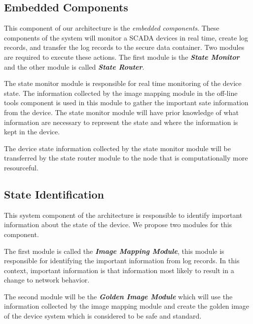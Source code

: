 \documentclass[conference]{IEEEtran}
\begin{document}
\subsection{Embedded Components}
This component of our architecture is the {\em embedded components}. These components of the system will monitor a SCADA devices in real time, create log records, and transfer the log records to the secure data container. Two modules are required to execute these actions. The first module is the \textit{\textbf{State Monitor}} and the other module is called \textit{\textbf{State Router}}.

The state monitor module is responsible for real time monitoring of the device state. The information collected by the image mapping module in the off-line tools component is used in this module to gather the important sate information from the device. The state monitor module will have prior knowledge of what information are necessary to represent the state and where the information is kept in the device. 

The device state information collected by the state monitor module will be transferred by the state router module to the node that is computationally more resourceful. 


\subsection{State Identification}
This system component of the architecture is responsible to identify important information about the state of the device.  We propose two modules for this component. \par The first module is called the \textit{\textbf{Image Mapping Module}}, this module is responsible for identifying the important information from log records.  In this context, important information is that information most likely to result in a change to network behavior.

The second module will be the \textit{\textbf{Golden Image Module}} which will use the information collected by the image mapping module and create the golden image of the device system which is considered to be safe and standard. 
\end{document}
